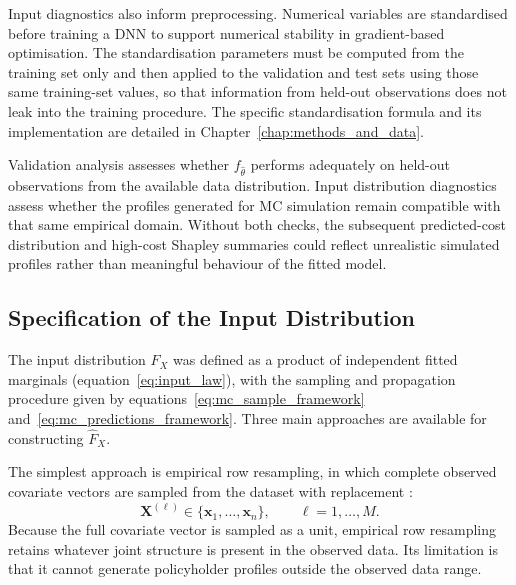 \noindent
Input diagnostics also inform preprocessing. Numerical variables are
standardised before training a DNN to support numerical stability in
gradient-based optimisation. The standardisation parameters must be computed from
the training set only and then applied to the validation and test sets using
those same training-set values, so that information from held-out observations
does not leak into the training procedure. The specific standardisation formula
and its implementation are detailed in Chapter~\ref{chap:methods_and_data}.

\noindent
Validation analysis assesses whether
\(f_{\widehat{\theta}}\) performs adequately on held-out observations from the
available data distribution. Input distribution diagnostics assess whether the
profiles generated for MC simulation remain compatible with that same
empirical domain. Without both checks, the subsequent predicted-cost
distribution and high-cost Shapley summaries could reflect unrealistic simulated
profiles rather than meaningful behaviour of the fitted model.


\subsection{Specification of the Input Distribution}
\label{sec:input_simulation_uncertainty_dependence}

\noindent
The input distribution
\(\widehat{F}_{X}\) was defined as a product of independent fitted marginals
(equation~\eqref{eq:input_law}), with the sampling and propagation
procedure given by equations~\eqref{eq:mc_sample_framework}
and~\eqref{eq:mc_predictions_framework}. Three main
approaches are available for constructing \(\widehat{F}_{X}\).

\noindent
The simplest approach is empirical row resampling, in which complete observed
covariate vectors are sampled from the dataset with replacement
\citep{efron1993bootstrap}:
\begin{equation}
\label{eq:row_resampling}
    \mathbf{X}^{(\ell)}
    \in
    \{\mathbf{x}_1,\ldots,\mathbf{x}_n\},
    \qquad
    \ell=1,\ldots,M.
\end{equation}
Because the full covariate vector is sampled as a unit, empirical row resampling
retains whatever joint structure is present in the observed data. Its limitation
is that it cannot generate policyholder profiles outside the observed data
range.

